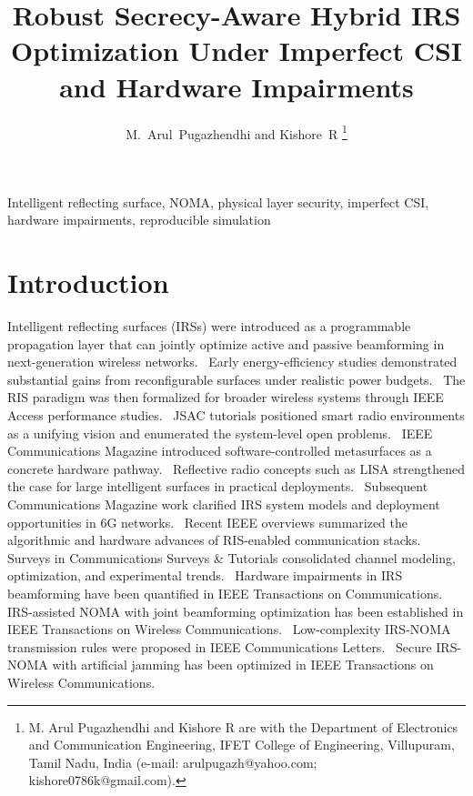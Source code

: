 \documentclass[journal]{IEEEtran}
\title{Robust Secrecy-Aware Hybrid IRS Optimization Under Imperfect CSI and Hardware Impairments}
\author{M.~Arul~Pugazhendhi and Kishore~R%
\thanks{M. Arul Pugazhendhi and Kishore R are with the Department of Electronics and Communication Engineering, IFET College of Engineering, Villupuram, Tamil Nadu, India (e-mail: arulpugazh@yahoo.com; kishore0786k@gmail.com).}}
\begin{document}
\maketitle

\begin{abstract}

\end{abstract}

\begin{IEEEkeywords}
Intelligent reflecting surface, NOMA, physical layer security, imperfect CSI, hardware impairments, reproducible simulation
\end{IEEEkeywords}

\section{Introduction}
Intelligent reflecting surfaces (IRSs) were introduced as a programmable propagation layer that can jointly optimize active and passive beamforming in next-generation wireless networks.~\cite{wu2018_glob} 
Early energy-efficiency studies demonstrated substantial gains from reconfigurable surfaces under realistic power budgets.~\cite{huang2019_twc}
The RIS paradigm was then formalized for broader wireless systems through IEEE Access performance studies.~\cite{basar2019_access}
JSAC tutorials positioned smart radio environments as a unifying vision and enumerated the system-level open problems.~\cite{direnzo2020_jsac}
IEEE Communications Magazine introduced software-controlled metasurfaces as a concrete hardware pathway.~\cite{liaskos2018_commag}
Reflective radio concepts such as LISA strengthened the case for large intelligent surfaces in practical deployments.~\cite{liang2019_jcin}
Subsequent Communications Magazine work clarified IRS system models and deployment opportunities in 6G networks.~\cite{wu2020_commag}
Recent IEEE overviews summarized the algorithmic and hardware advances of RIS-enabled communication stacks.~\cite{dai2020_commag}
Surveys in Communications Surveys \& Tutorials consolidated channel modeling, optimization, and experimental trends.~\cite{gong2020_cst}
Hardware impairments in IRS beamforming have been quantified in IEEE Transactions on Communications.~\cite{shen2021_tcom}
IRS-assisted NOMA with joint beamforming optimization has been established in IEEE Transactions on Wireless Communications.~\cite{mu2020_twc}
Low-complexity IRS-NOMA transmission rules were proposed in IEEE Communications Letters.~\cite{ding2020_lcomm}
Secure IRS-NOMA with artificial jamming has been optimized in IEEE Transactions on Wireless Communications.~\cite{wang2022_twc}
\end{document}
